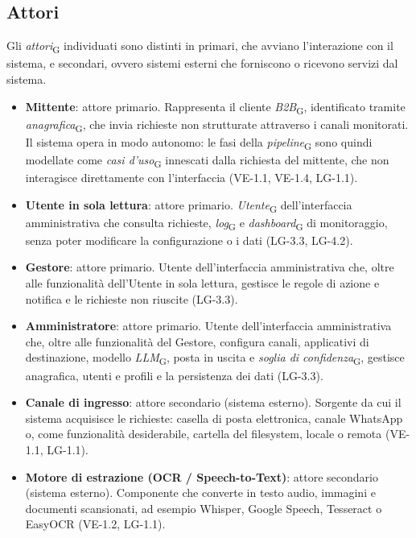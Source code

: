 \subsection{Attori}
Gli \textit{attori}\textsubscript{G} individuati sono distinti in primari, che avviano l'interazione con il sistema, e secondari, ovvero sistemi esterni che forniscono o ricevono servizi dal sistema.

\begin{itemize}
    \item \textbf{Mittente}: attore primario. Rappresenta il cliente \textit{B2B}\textsubscript{G}, identificato tramite \textit{anagrafica}\textsubscript{G}, che invia richieste non strutturate attraverso i canali monitorati. Il sistema opera in modo autonomo: le fasi della \textit{pipeline}\textsubscript{G} sono quindi modellate come \textit{casi d'uso}\textsubscript{G} innescati dalla richiesta del mittente, che non interagisce direttamente con l'interfaccia (VE-1.1, VE-1.4, LG-1.1).
    \item \textbf{Utente in sola lettura}: attore primario. \textit{Utente}\textsubscript{G} dell'interfaccia amministrativa che consulta richieste, \textit{log}\textsubscript{G} e \textit{dashboard}\textsubscript{G} di monitoraggio, senza poter modificare la configurazione o i dati (LG-3.3, LG-4.2).
    \item \textbf{Gestore}: attore primario. Utente dell'interfaccia amministrativa che, oltre alle funzionalità dell'Utente in sola lettura, gestisce le regole di azione e notifica e le richieste non riuscite (LG-3.3).
    \item \textbf{Amministratore}: attore primario. Utente dell'interfaccia amministrativa che, oltre alle funzionalità del Gestore, configura canali, applicativi di destinazione, modello \textit{LLM}\textsubscript{G}, posta in uscita e \textit{soglia di confidenza}\textsubscript{G}, gestisce anagrafica, utenti e profili e la persistenza dei dati (LG-3.3).
    \item \textbf{Canale di ingresso}: attore secondario (sistema esterno). Sorgente da cui il sistema acquisisce le richieste: casella di posta elettronica, canale WhatsApp o, come funzionalità desiderabile, cartella del filesystem, locale o remota (VE-1.1, LG-1.1).
    \item \textbf{Motore di estrazione (OCR / Speech-to-Text)}: attore secondario (sistema esterno). Componente che converte in testo audio, immagini e documenti scansionati, ad esempio Whisper, Google Speech, Tesseract o EasyOCR (VE-1.2, LG-1.1).

\end{itemize}
